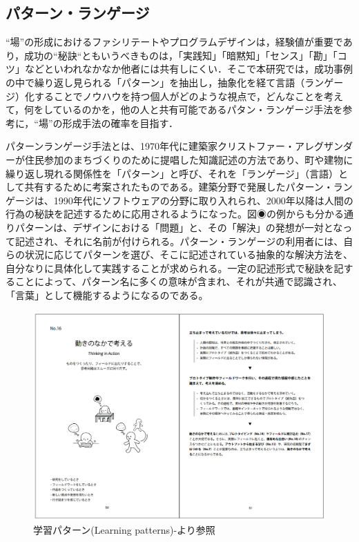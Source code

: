 \documentclass[a4paper]{jsarticle}
\begin{document}
\subsection{パターン・ランゲージ}
“場”の形成におけるファシリテートやプログラムデザインは，経験値が重要であり，成功の“秘訣“ともいうべきものは，「実践知」「暗黙知」「センス」「勘」「コツ」などといわれなかなか他者には共有しにくい．そこで本研究では，成功事例の中で繰り返し見られる「パターン」を抽出し，抽象化を経て言語（ランゲージ）化することでノウハウを持つ個人がどのような視点で，どんなことを考えて，何をしているのかを，他の人と共有可能であるパタン・ランゲージ手法\cite{ptn}を参考に，“場”の形成手法の確率を目指す．\par
パターンランゲージ手法とは、1970年代に建築家クリストファー・アレグザンダーが住民参加のまちづくりのために提唱した知識記述の方法であり、町や建物に繰り返し現れる関係性を「パターン」と呼び、それを「ランゲージ」（言語）として共有するために考案されたものである。\cite{arek}建築分野で発展したパターン・ランゲージは、1990年代にソフトウェアの分野に取り入れられ、2000年以降は人間の行為の秘訣を記述するために応用されるようになった。図◉の例からも分かる通りパターンは、デザインにおける「問題」と、その「解決」の発想が一対となって記述され、それに名前が付けられる。パターン・ランゲージの利用者には、自らの状況に応じてパターンを選び、そこに記述されている抽象的な解決方法を、自分なりに具体化して実践することが求められる。一定の記述形式で秘訣を記することによって、パターン名に多くの意味が含まれ、それが共通で認識され、「言葉」として機能するようになるのである。\cite{ptn}


\begin{figure}[H]
  \begin{center}
    \includegraphics[width=1.0\hsize]{./images/ptn.jpg}
    \caption{学習パターン(Learning patterns)-\cite{ptn}より参照}
    \label{fig:tmu_hino}
  \end{center}
\end{figure}
\end{document}

